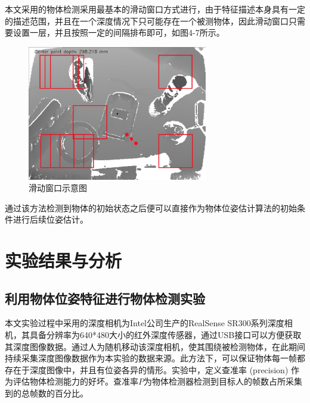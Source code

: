 本文采用的物体检测采用最基本的滑动窗口方式进行，由于特征描述本身具有一定的描述范围，并且在一个深度情况下只可能存在一个被测物体，因此滑动窗口只需要设置一层，并且按照一定的间隔排布即可，如图4-7所示。

\begin{figure}[htb]
	\centering 
	\includegraphics[width=0.7\textwidth]{./mypic/滑动窗口示意图.jpg} 
	\caption{滑动窗口示意图} 
\end{figure}
通过该方法检测到物体的初始状态之后便可以直接作为物体位姿估计算法的初始条件进行后续位姿估计。

\section{实验结果与分析} %

\subsection{利用物体位姿特征进行物体检测实验}

本文实验过程中采用的深度相机为Intel公司生产的RealSense SR300系列深度相机，其具备分辨率为640*480大小的红外深度传感器，通过USB接口可以方便获取其深度图像数据。通过人为随机移动该深度相机，使其围绕被检测物体，在此期间持续采集深度图像数据作为本实验的数据来源。此方法下，可以保证物体每一帧都存在于深度图像中，并且有位姿各异的情形。实验中，定义查准率 (precision) 作为评估物体检测能力的好坏。查准率$P$为物体检测器检测到目标人的帧数占所采集到的总帧数的百分比。

